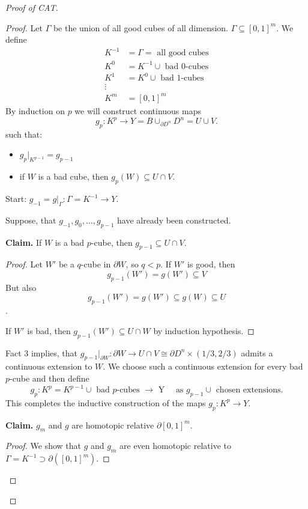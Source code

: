 \documentclass{TemplateLecture}
\begin{document}
\begin{proof}[Proof of CAT]
\begin{proof}
        Let \(\Gamma\) be the union of all good cubes of all dimension. \(\Gamma \subseteq [0,1]^m\). We define
        \[\begin{array}{rl}
            K^{-1} &= \Gamma = \text{ all good cubes} \\
            K^0 &= K^{-1} \cup \text{ bad \(0\)-cubes} \\
            K^1 &= K^0 \cup \text{ bad \(1\)-cubes} \\
            \vdots & \\
            K^m &= [0,1]^m
        \end{array}\]
        By induction on \(p\) we will construct continuous maps
        \[g_p \colon K^p \to Y = B\cup_{\partial D^n} D^n = U\cup V.\]
        such that:
        \begin{itemize}
            \item \(g_p\rvert_{K^{p-1}} = g_{p-1}\)
            \item if \(W\) is a bad cube, then \(g_p(W) \subseteq U\cap V\).
        \end{itemize}
        Start: \(g_{-1} = g\rvert_\Gamma \colon \Gamma = K^{-1} \to Y\).

        Suppose, that \(g_{-1}, g_0, \dots, g_{p-1}\) have already been constructed.
        
        \textbf{Claim.} If \(W\) is a bad \(p\)-cube, then \(g_{p-1} \subseteq U\cap V\).
        \begin{proof}
            Let \(W'\) be a \(q\)-cube in \(\partial W\), so \(q < p\).
            If \(W'\) is good, then
            \[g_{p-1}(W') = g(W') \subseteq V\]
            But also
            \[g_{p-1}(W') = g(W') \subseteq g(W) \subseteq U\].
            
            If \(W'\) is bad, then \(g_{p-1}(W') \subseteq U\cap W\) by induction hypothesis.
        \end{proof}
        Fact 3 implies, that \(g_{p-1}\rvert_{\partial W}\colon \partial W \to U\cap V \cong \partial D^n \times (1/3,2/3)\) admits a continuous extension to \(W\). We choose such a continuous extension for every bad \(p\)-cube and then define
        \[g_p\colon K^p = K^{p-1} \cup \text{ bad \(p\)-cubes \(\to\) Y} \quad \text{ as }g_{p-1} \cup \text{ chosen extensions}.\]
        This completes the inductive construction of the maps \(g_p \colon K^p \to Y\).
        
        \textbf{Claim.} \(g_m\) and \(g\) are homotopic relative \(\partial [0,1]^m\).
        \begin{proof}
            We show that \(g\) and \(g_m\) are even homotopic relative to \(\Gamma = K^{-1} \supset \partial([0,1]^m)\).


\end{proof}
\end{proof}
\end{proof}
\end{document}
